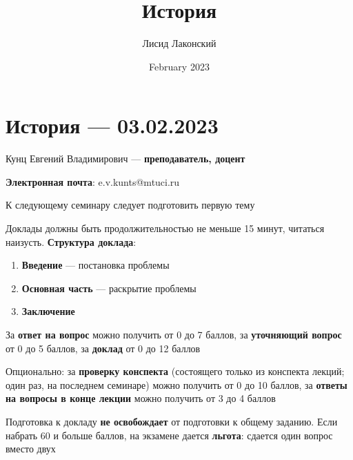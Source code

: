 \documentclass{article}
\title{История}
\author{Лисид Лаконский}
\date{February 2023}
\begin{document}
\raggedright

\maketitle
\tableofcontents
\pagebreak

\section{История — 03.02.2023}

Кунц Евгений Владимирович — \textbf{преподаватель, доцент}

\textbf{Электронная почта}: e.v.kunts@mtuci.ru

К следующему семинару следует подготовить первую тему

\hfill

Доклады должны быть продолжительностью не меньше 15 минут, читаться наизусть. \textbf{Структура доклада}:
\begin{enumerate}
    \item \textbf{Введение} — постановка проблемы
    \item \textbf{Основная часть} — раскрытие проблемы
    \item \textbf{Заключение}
\end{enumerate}

\hfill

За \textbf{ответ на вопрос} можно получить от 0 до 7 баллов, за \textbf{уточняющий вопрос} от 0 до 5 баллов, за \textbf{доклад} от 0 до 12 баллов

Опционально: за \textbf{проверку конспекта} (состоящего только из конспекта лекций; один раз, на последнем семинаре) можно получить от 0 до 10 баллов, за \textbf{ответы на вопросы в конце лекции} можно получить от 3 до 4 баллов

\hfill

Подготовка к докладу \textbf{не освобождает} от подготовки к общему заданию. Если набрать 60 и больше баллов, на экзамене дается \textbf{льгота}: сдается один вопрос вместо двух
\end{document}

